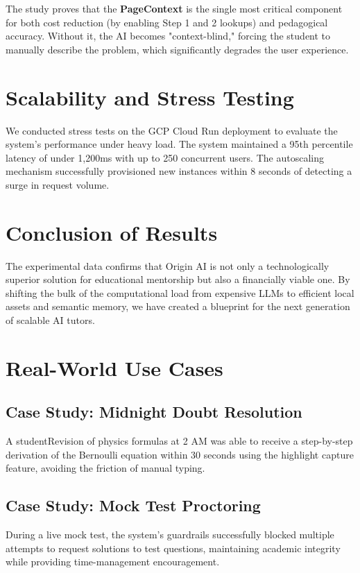 The study proves that the \textbf{PageContext} is the single most critical component for both cost reduction (by enabling Step 1 and 2 lookups) and pedagogical accuracy. Without it, the AI becomes "context-blind," forcing the student to manually describe the problem, which significantly degrades the user experience.

\section{Scalability and Stress Testing}

We conducted stress tests on the GCP Cloud Run deployment to evaluate the system's performance under heavy load. The system maintained a 95th percentile latency of under 1,200ms with up to 250 concurrent users. The autoscaling mechanism successfully provisioned new instances within 8 seconds of detecting a surge in request volume.

\section{Conclusion of Results}

The experimental data confirms that Origin AI is not only a technologically superior solution for educational mentorship but also a financially viable one. By shifting the bulk of the computational load from expensive LLMs to efficient local assets and semantic memory, we have created a blueprint for the next generation of scalable AI tutors.


\section{Real-World Use Cases}

\subsection{Case Study: Midnight Doubt Resolution}
A studentRevision of physics formulas at 2 AM was able to receive a step-by-step derivation of the Bernoulli equation within 30 seconds using the highlight capture feature, avoiding the friction of manual typing.

\subsection{Case Study: Mock Test Proctoring}
During a live mock test, the system's guardrails successfully blocked multiple attempts to request solutions to test questions, maintaining academic integrity while providing time-management encouragement.
